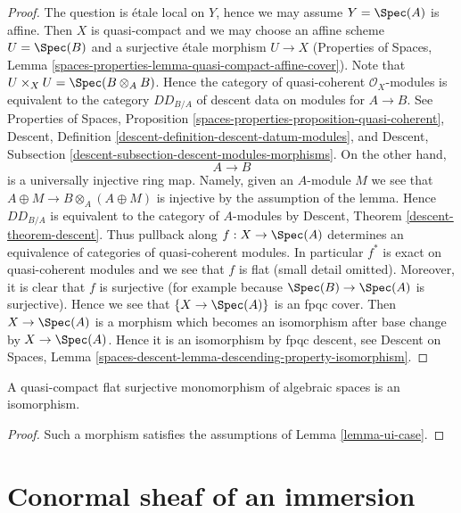 \begin{proof}
The question is \'etale local on $Y$, hence we may assume $Y = \Spec(A)$
is affine. Then $X$ is quasi-compact and we may choose an affine scheme
$U = \Spec(B)$ and a surjective \'etale morphism $U \to X$
(Properties of Spaces, Lemma
\ref{spaces-properties-lemma-quasi-compact-affine-cover}).
Note that $U \times_X U = \Spec(B \otimes_A B)$. Hence the category of
quasi-coherent $\mathcal{O}_X$-modules is equivalent to the
category $DD_{B/A}$ of descent data on modules for $A \to B$.
See Properties of Spaces, Proposition
\ref{spaces-properties-proposition-quasi-coherent},
Descent, Definition \ref{descent-definition-descent-datum-modules}, and
Descent, Subsection \ref{descent-subsection-descent-modules-morphisms}.
On the other hand,
$$
A \to B
$$
is a universally injective ring map. Namely, given an
$A$-module $M$ we see that $A \oplus M \to B \otimes_A (A \oplus M)$
is injective by the assumption of the lemma. Hence
$DD_{B/A}$ is equivalent to the category of $A$-modules by
Descent, Theorem \ref{descent-theorem-descent}. Thus pullback along
$f : X \to \Spec(A)$ determines an equivalence of categories of
quasi-coherent modules. In particular $f^*$ is exact on
quasi-coherent modules and we see that $f$ is flat
(small detail omitted). Moreover, it is clear that $f$ is surjective
(for example because $\Spec(B) \to \Spec(A)$ is surjective).
Hence we see that $\{X \to \Spec(A)\}$ is an fpqc cover.
Then $X \to \Spec(A)$ is a morphism which becomes an isomorphism
after base change by $X \to \Spec(A)$. Hence it is an isomorphism by
fpqc descent, see Descent on Spaces, Lemma
\ref{spaces-descent-lemma-descending-property-isomorphism}.
\end{proof}

\begin{lemma}
\label{lemma-flat-surjective-monomorphism}
A quasi-compact flat surjective monomorphism of algebraic spaces
is an isomorphism.
\end{lemma}

\begin{proof}
Such a morphism satisfies the assumptions of Lemma \ref{lemma-ui-case}.
\end{proof}







\section{Conormal sheaf of an immersion}
\label{section-conormal-sheaf}

